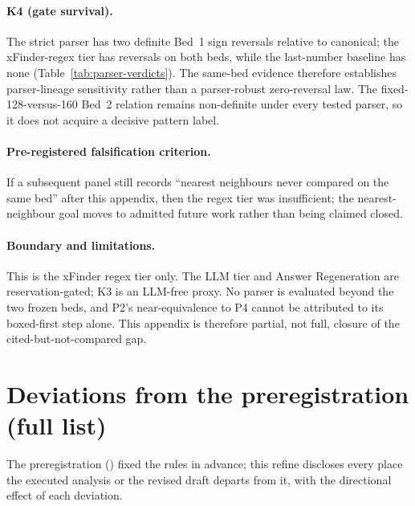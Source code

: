 \documentclass{article}
\begin{document}
\paragraph{K4 (gate survival).}
The strict parser has two definite Bed~1 sign reversals relative to canonical;
the xFinder-regex tier has reversals on both beds, while the last-number
baseline has none (Table~\ref{tab:parser-verdicts}).  The same-bed evidence
therefore establishes parser-lineage sensitivity rather than a parser-robust
zero-reversal law.  The fixed-128-versus-160 Bed~2 relation remains
non-definite under every tested parser, so it does not acquire a decisive
pattern label.

\paragraph{Pre-registered falsification criterion.}
If a subsequent panel still records ``nearest neighbours never compared on
the same bed'' after this appendix, then the regex tier was insufficient; the
nearest-neighbour goal moves to admitted future work rather than being claimed
closed.

\paragraph{Boundary and limitations.}
This is the xFinder regex tier only.  The LLM tier and Answer Regeneration are
reservation-gated; K3 is an LLM-free proxy.  No parser is evaluated beyond the
two frozen beds, and \textsc{P2}'s near-equivalence to \textsc{P4} cannot be
attributed to its boxed-first step alone.  This appendix is therefore partial,
not full, closure of the cited-but-not-compared gap.


\section{Deviations from the preregistration (full list)}\label{sec:appx_deviations}

The preregistration () fixed the rules in advance;
this refine discloses every place the executed analysis or the revised draft departs from it, with the
directional effect of each deviation.
\end{document}
